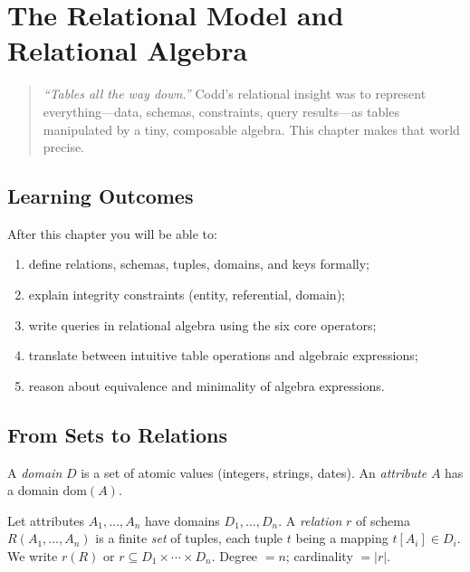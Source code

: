 \chapter{The Relational Model and Relational Algebra}
\label{ch:relational}

\begin{quote}
\emph{``Tables all the way down.''} Codd's relational insight was to represent everything---data, schemas, constraints, query results---as tables manipulated by a tiny, composable algebra. This chapter makes that world precise.
\end{quote}

\noindent{}
\vspace{0.4em}

\section*{Learning Outcomes}
After this chapter you will be able to:
\begin{enumerate}[label=(L\arabic*)]
    \item define relations, schemas, tuples, domains, and keys formally;
    \item explain integrity constraints (entity, referential, domain);
    \item write queries in relational algebra using the six core operators;
    \item translate between intuitive table operations and algebraic expressions;
    \item reason about equivalence and minimality of algebra expressions.
\end{enumerate}

\section{From Sets to Relations}
\label{sec:sets-to-relations}

A \emph{domain} $D$ is a set of atomic values (integers, strings, dates). An \emph{attribute} $A$ has a domain $\mathrm{dom}(A)$.

\begin{definition}
Let attributes $A_1,\dots,A_n$ have domains $D_1,\dots,D_n$. A \emph{relation} $r$ of schema $R(A_1,\dots,A_n)$ is a finite \emph{set} of tuples, each tuple $t$ being a mapping $t[A_i]\in D_i$. We write $r(R)$ or $r\subseteq D_1\times\cdots\times D_n$. Degree $=n$; cardinality $=|r|$.
\end{definition}

